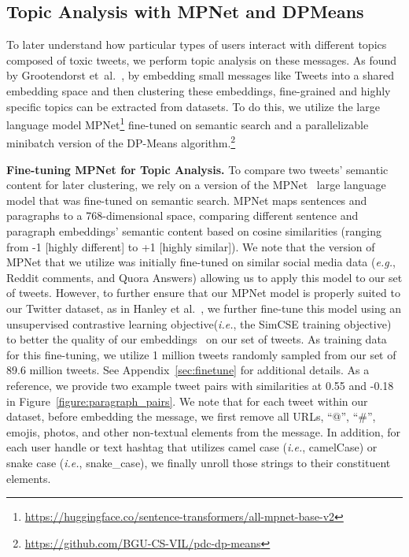  
\subsection{Topic Analysis with MPNet and DPMeans\label{sec:topic-background}} To later understand how particular types of users interact with different topics composed of toxic tweets, we perform topic analysis on these messages. As found by Grootendorst {et~al.}~\cite{grootendorst2020bertopic,hanley2023partial}, by embedding small messages like Tweets into a shared embedding space and then clustering these embeddings, fine-grained and highly specific topics can be extracted from datasets. To do this, we utilize the large language model MPNet\footnote{\url{https://huggingface.co/sentence-transformers/all-mpnet-base-v2}} fine-tuned on semantic search and a parallelizable minibatch version of the DP-Means algorithm.\footnote{\url{https://github.com/BGU-CS-VIL/pdc-dp-means}}

\vspace{2pt}\noindent
\noindent
\textbf{Fine-tuning MPNet for Topic Analysis.} To compare two tweets' semantic content for later clustering, we rely on a version of the MPNet~\cite{song2020mpnet} large language model that was fine-tuned on semantic search. MPNet maps sentences and paragraphs to a 768-dimensional space, comparing different sentence and paragraph embeddings' semantic content based on cosine similarities (ranging from -1 [highly different] to +1 [highly similar]). We note that the version of MPNet that we utilize was initially fine-tuned on similar social media data (\textit{e.g.}, Reddit comments, and Quora Answers) allowing us to apply this model to our set of tweets. However, to further ensure that our MPNet model is properly suited to our Twitter dataset, as in Hanley et al.~\cite{hhanleyspecious2024}, we further fine-tune this model using an unsupervised contrastive learning objective(\textit{i.e.}, the SimCSE training objective) to better the quality of our embeddings~\cite{gao-etal-2021-simcse}  on our set of tweets. As training data for this fine-tuning, we utilize 1 million tweets randomly sampled from our set of 89.6 million tweets.  See Appendix~\ref{sec:finetune} for additional details. As a reference, we provide two example tweet pairs with similarities at 0.55 and -0.18 in Figure~\ref{figure:paragraph_pairs}. We note that for each tweet within our dataset, before embedding the message, we first remove all URLs, ``@'', ``\#'', emojis, photos, and other non-textual elements from the message. In addition, for each user handle or text hashtag that utilizes camel case (\textit{i.e.}, camelCase) or snake case (\textit{i.e.}, snake\_case), we finally unroll those strings to their constituent elements.


